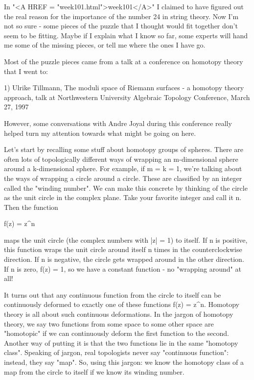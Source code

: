 

In "<A HREF = "week101.html">week101</A>" I claimed to have
figured out the real reason for the importance of the number 24 in
string theory.  Now I'm not so sure - some pieces of the puzzle that
I thought would fit together don't seem to be fitting.  Maybe if I
explain what I know so far, some experts will hand me some of the
missing pieces, or tell me where the ones I have go.

Most of the puzzle pieces came from a talk at a conference on homotopy
theory that I went to:

1) Ulrike Tillmann, The moduli space of Riemann surfaces - a homotopy
theory approach, talk at Northwestern University Algebraic Topology
Conference, March 27, 1997

However, some conversations with Andre Joyal during this conference
really helped turn my attention towards what might be going on here.

Let's start by recalling some stuff about homotopy groups of spheres.
There are often lots of topologically different ways of wrapping an
m-dimensional sphere around a k-dimensional sphere.  For example, if
m = k = 1, we're talking about the ways of wrapping a circle around a
circle.  These are classified by an integer called the "winding number".
We can make this concrete by thinking of the circle as the unit circle
in the complex plane.  Take your favorite integer and call it n.  Then
the function 

f(z) = z^{n}

maps the unit circle (the complex numbers with |z| = 1) to itself.  If n
is positive, this function wraps the unit circle around itself n times
in the counterclockwise direction.  If n is negative, the circle gets
wrapped around in the other direction.  If n is zero, f(z) = 1, so we
have a constant function - no "wrapping around" at all!  

It turns out that any continuous function from the circle to itself can
be continuously deformed to exactly one of these functions f(z) = z^{n}.
Homotopy theory is all about such continuous deformations.  In the
jargon of homotopy theory, we say two functions from some space to some
other space are "homotopic" if we can continuously deform the first
function to the second.  Another way of putting it is that the two
functions lie in the same "homotopy class".  Speaking of jargon, real
topologists never say "continuous function": instead, they say "map".
So, using this jargon: we know the homotopy class of a map from the
circle to itself if we know its winding number.

